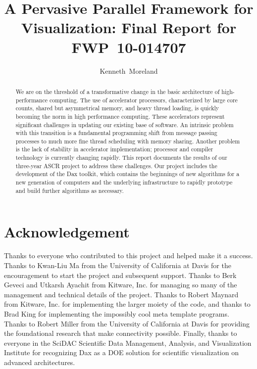 \documentclass[12pt,report]{SANDreport}
\title{A Pervasive Parallel Framework for Visualization: Final Report for
  FWP~10-014707}
\author{Kenneth~Moreland}
\date{} %
\begin{document}
\sloppy

\maketitle

\begin{abstract}
  We are on the threshold of a transformative change in the basic
  architecture of high-performance computing.  The use of accelerator
  processors, characterized by large core counts, shared but asymmetrical
  memory, and heavy thread loading, is quickly becoming the norm in high
  performance computing.  These accelerators represent significant
  challenges in updating our existing base of software.  An intrinsic
  problem with this transition is a fundamental programming shift from
  message passing processes to much more fine thread scheduling with memory
  sharing.  Another problem is the lack of stability in accelerator
  implementation; processor and compiler technology is currently changing
  rapidly. This report documents the results of our three-year ASCR project
  to address these challenges. Our project includes the development of the
  Dax toolkit, which contains the beginnings of new algorithms for a new
  generation of computers and the underlying infrastructure to rapidly
  prototype and build further algorithms as necessary.
\end{abstract}

\clearpage

\chapter*{Acknowledgement}

Thanks to everyone who contributed to this project and helped make it a
success. Thanks to Kwan-Liu Ma from the University of California at Davis
for the encouragement to start the project and subsequent support. Thanks to
Berk Geveci and Utkarsh Ayachit from Kitware, Inc. for managing so many of
the management and technical details of the project. Thanks to Robert
Maynard from Kitware, Inc. for implementing the larger moiety of the code,
and thanks to Brad King for implementing the impossibly cool meta template
programs. Thanks to Robert Miller from the University of California at
Davis for providing the foundational research that make connectivity
possible. Finally, thanks to everyone in the SciDAC Scientific Data
Management, Analysis, and Visualization Institute for recognizing Dax as a
DOE solution for scientific visualization on advanced architectures.
\end{document}

